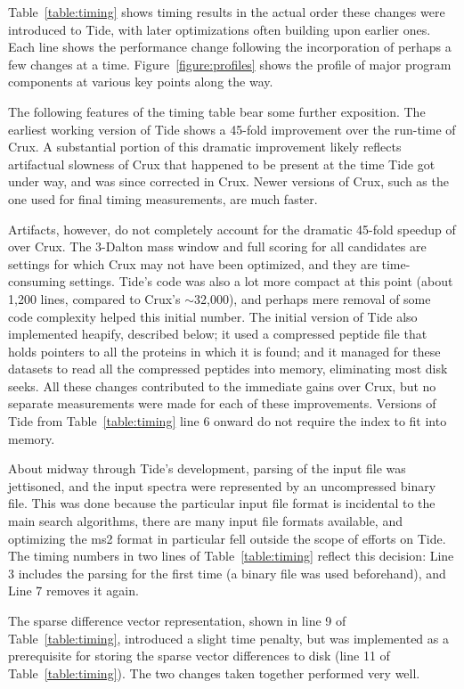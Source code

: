 Table~\ref{table:timing} shows timing results in the actual order
these changes were introduced to Tide, with later optimizations often
building upon earlier ones. Each line shows the performance change
following the incorporation of perhaps a few changes at a
time. Figure~\ref{figure:profiles} shows the profile of major program
components at various key points along the way.

The following features of the timing table bear some further
exposition. The earliest working version of Tide shows a 45-fold
improvement over the run-time of Crux. A substantial portion of this
dramatic improvement likely reflects artifactual slowness of Crux that
happened to be present at the time Tide got under way, and was since
corrected in Crux. Newer versions of Crux, such as the one used for final
timing measurements, are much faster.

Artifacts, however, do not completely account for the dramatic 45-fold
speedup of \tidezero over Crux. The 3-Dalton mass window and full
\XCorr scoring for all candidates are settings for which Crux may not
have been optimized, and they are time-consuming settings. Tide's code
was also a lot more compact at this point (about 1,200 lines, compared
to Crux's $\sim$32,000), and perhaps mere removal of some code complexity
helped this initial number. The initial version of Tide also
implemented heapify, described below; it used a compressed peptide
file that holds pointers to all the proteins in which it is found; and
it managed for these datasets to read all the compressed peptides into
memory, eliminating most disk seeks. All these changes contributed to
the immediate gains over Crux, but no separate measurements were made
for each of these improvements. Versions of Tide from
Table~\ref{table:timing} line 6 onward do not require the index to fit
into memory.

About midway through Tide's development, parsing of the input file
was jettisoned, and the input spectra were represented by an
uncompressed binary file. This was done because the particular input
file format is incidental to the main search algorithms, there are
many input file formats available, and optimizing the ms2 format in
particular fell outside the scope of efforts on Tide. The timing
numbers in two lines of Table~\ref{table:timing} reflect this
decision: Line 3 includes the parsing for the first time (a binary
file was used beforehand), and Line 7 removes it again.

The sparse difference vector representation, shown in line 9 of
Table~\ref{table:timing}, introduced a slight time penalty, but was implemented
as a prerequisite for storing the sparse vector differences to disk (line 11 of
Table~\ref{table:timing}). The two changes taken together performed very well.


